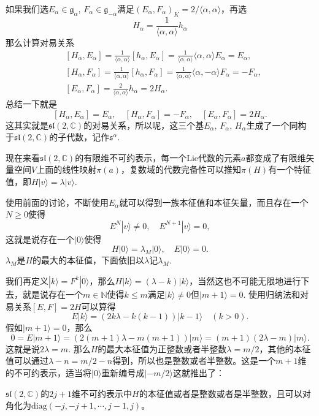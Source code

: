 \documentclass[9pt]{extarticle}
\newcommand{\cc}{\mathbb{C}}
\newcommand{\lag}{{\mathfrak{g}}}
\begin{document}
\para 如果我们选$E_\alpha\in\lag_\alpha$, $F_\alpha\in\lag_{-\alpha}$满足$(E_\alpha,F_{\alpha})_K=2/\langle \alpha,\alpha \rangle$，再选
\[
	H_\alpha=\frac{1}{\langle \alpha,\alpha \rangle}h_\alpha
\]
那么计算对易关系
\[
	\begin{split}
	&[H_\alpha,E_\alpha]=\frac{1}{\langle \alpha,\alpha \rangle}[h_\alpha,E_\alpha]=\frac{1}{\langle \alpha,\alpha \rangle}\langle \alpha,\alpha \rangle E_\alpha=E_\alpha,\\
	&[H_\alpha,F_\alpha]=\frac{1}{\langle \alpha,\alpha \rangle}[h_\alpha,F_\alpha]=\frac{1}{\langle \alpha,\alpha \rangle}\langle \alpha,-\alpha \rangle F_\alpha=-F_\alpha,\\
	&[E_\alpha,F_\alpha]=\frac{2}{\langle \alpha,\alpha \rangle}h_\alpha=2H_\alpha.
	\end{split}
\]
总结一下就是
\[
	[H_\alpha,E_\alpha]=E_\alpha,\quad[H_\alpha,F_\alpha]=-F_\alpha,\quad[E_\alpha,F_\alpha]=2H_\alpha.
\]
这其实就是$\mathfrak{sl}(2,\cc)$的对易关系，所以呢，这三个基$E_\alpha$, $F_\alpha$, $H_\alpha$生成了一个同构于$\mathfrak{sl}(2,\cc)$的子代数，记作$\mathfrak{s}^\alpha$.

\para 现在来看$\mathfrak{sl}(2,\cc)$的有限维不可约表示，每一个Lie代数的元素$a$都变成了有限维矢量空间$V$上面的线性映射$\pi(a)$，复数域的代数完备性可以推知$\pi(H)$有一个特征值，即$H|v\rangle=\lambda |v\rangle$.

使用前面的讨论，不断使用$E_\alpha$就可以得到一族本征值和本征矢量，而且存在一个$N\geq 0$使得
\[
	E^N|v\rangle\neq 0,\quad E^{N+1}|v\rangle =0,
\]
这就是说存在一个$|0\rangle$使得
\[
	H|0\rangle =\lambda_M |0\rangle,\quad E|0\rangle =0.
\]
$\lambda_M$是$H$的最大的本征值，下面依旧以$\lambda$记$\lambda_M$.

我们再定义$|k\rangle=F^k|0\rangle$，那么$H|k\rangle=(\lambda-k) |k\rangle$，当然这也不可能无限地进行下去，就是说存在一个$m\in \mathbb{N}$使得$k\leq m$满足$|k\rangle\neq 0$但$|m+1\rangle=0$. 使用归纳法和对易关系$[E,F]=2H$可以算得
\[
E|k\rangle=(2k\lambda -k(k-1)) |k-1\rangle\quad (k>0).
\]
假如$|m+1\rangle =0$，那么
\[
0=E|m+1\rangle=(2(m+1)\lambda -m(m+1)) |m\rangle =(m+1)(2\lambda-m)|m\rangle.
\]
这就是说$2\lambda=m$. 那么$H$的最大本征值为正整数或者半整数$\lambda=m/2$，其他的本征值可以通过$\lambda-n=m/2-n$得到，所以也是整数或者半整数。这是一个$m+1$维的不可约表示，适当将$|0\rangle$重新编号成$|-m/2\rangle$这就推出了：

\pro $\mathfrak{sl}(2,\cc)$的$2j+1$维不可约表示中$H$的本征值或者是整数或者是半整数，且可以对角化为$\mathrm{diag}(-j,-j+1,\cdots,j-1,j)$。
\end{document}
